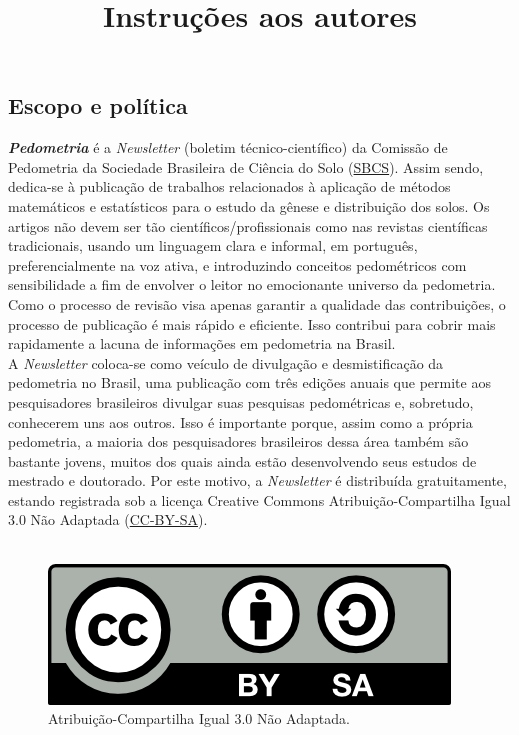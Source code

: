 \title{Instruções aos autores}
\maketitle
\subsection{Escopo e política}
\textbf{\em Pedometria} é a \textit{Newsletter} (boletim técnico-científico) da Comissão de Pedometria da Sociedade Brasileira de Ciência do Solo (\href{http://www.sbcs.org.br/}{SBCS}). Assim sendo, dedica-se à publicação de trabalhos relacionados à aplicação de métodos matemáticos e estatísticos para o estudo da gênese e distribuição dos solos. Os artigos não devem ser tão científicos/profissionais como nas revistas científicas tradicionais, usando um linguagem clara e informal, em português, preferencialmente na voz ativa, e introduzindo conceitos pedométricos com sensibilidade a fim de envolver o leitor no emocionante universo da pedometria. Como o processo de revisão visa apenas garantir a qualidade das contribuições, o processo de publicação é mais rápido e eficiente. Isso contribui para cobrir mais rapidamente a lacuna de informações em pedometria na Brasil.\\
A \textit{Newsletter} coloca-se como veículo de divulgação e desmistificação da pedometria no Brasil, uma publicação com três edições anuais que permite aos pesquisadores brasileiros divulgar suas pesquisas pedométricas e, sobretudo, conhecerem uns aos outros. Isso é importante porque, assim como a própria pedometria, a maioria dos pesquisadores brasileiros dessa área também são bastante jovens, muitos dos quais ainda estão desenvolvendo seus estudos de mestrado e doutorado. Por este motivo, a \textit{Newsletter} é distribuída gratuitamente, estando registrada sob a licença Creative Commons Atribuição-Compartilha Igual 3.0 Não Adaptada (\href{http://creativecommons.org/licenses/by-sa/2.0/}{CC-BY-SA}).\\
\\
\begin{figure}[h!]
\centering
\includegraphics[scale=0.8]{figuras/cc-by-sa.png}
\caption{Atribuição-Compartilha Igual 3.0 Não Adaptada.}
\end{figure}
